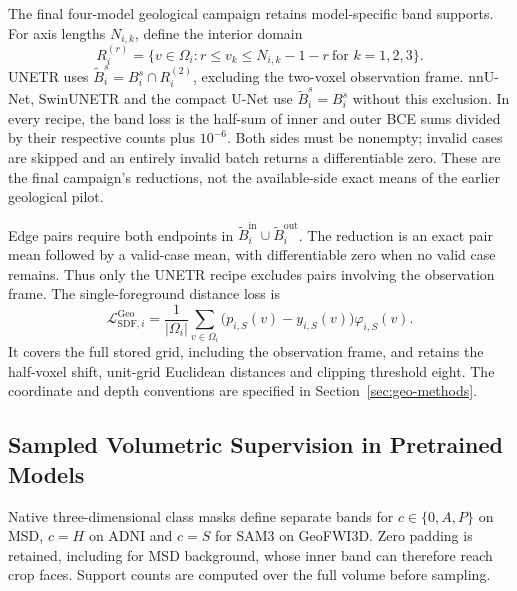 The final four-model geological campaign retains model-specific band
supports. For axis lengths $N_{i,k}$, define the interior domain
\begin{equation}
R_i^{(r)}=\{v\in\Omega_i:
 r\leq v_k\leq N_{i,k}-1-r\ \text{for }k=1,2,3\}.
\label{eq:geological-band-frame}
\end{equation}
UNETR uses $\widetilde B_i^s=B_i^s\cap R_i^{(2)}$, excluding the
two-voxel observation frame. nnU-Net, SwinUNETR and the compact U-Net
use $\widetilde B_i^s=B_i^s$ without this exclusion. In every recipe,
the band loss is the half-sum of inner and outer BCE sums divided
by their respective counts plus $10^{-6}$. Both sides must be
nonempty; invalid cases are skipped and an entirely invalid batch
returns a differentiable zero. These are the final campaign's
reductions, not the available-side exact means of the earlier
geological pilot.

Edge pairs require both endpoints in
$\widetilde B_i^{\mathrm{in}}\cup\widetilde B_i^{\mathrm{out}}$.
The reduction is an exact pair mean followed by a valid-case mean,
with differentiable zero when no valid case remains. Thus only the
UNETR recipe excludes pairs involving the observation frame.
The single-foreground distance loss is
\begin{equation}
\mathcal{L}_{\mathrm{SDF},i}^{\mathrm{Geo}}
=\frac{1}{|\Omega_i|}\sum_{v\in\Omega_i}
 \bigl(p_{i,S}(v)-y_{i,S}(v)\bigr)\varphi_{i,S}(v).
\label{eq:geological-sdf-loss}
\end{equation}
It covers the full stored grid, including the observation frame,
and retains the half-voxel shift, unit-grid Euclidean distances and
clipping threshold eight. The coordinate and depth conventions are
specified in Section~\ref{sec:geo-methods}.

\subsection{Sampled Volumetric Supervision in Pretrained Models}
\label{sec:sampled-pretrained-supervision}

Native three-dimensional class masks define separate bands for
$c\in\{0,A,P\}$ on MSD, $c=H$ on ADNI and $c=S$ for SAM3 on
GeoFWI3D. Zero padding is retained, including for MSD background,
whose inner band can therefore reach crop faces. Support counts are
computed over the full volume before sampling.

